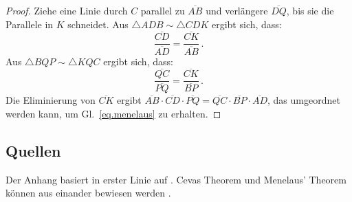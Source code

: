 \begin{proof}
Ziehe eine Linie durch $C$ parallel zu $\overline{AB}$ und verlängere $\overline{DQ}$, bis sie die Parallele in $K$ schneidet. Aus $\triangle ADB \sim \triangle CDK$ ergibt sich, dass:
\begin{equation*}
\displaystyle\frac{\overline{CD}}{\overline{AD}}=\displaystyle\frac{\overline{CK}}{\overline{AB}}\,.
\end{equation*}
Aus $\triangle BQP\sim \triangle KQC$ ergibt sich, dass:
\begin{equation*}
\displaystyle\frac{\overline{QC}}{\overline{PQ}}=\displaystyle\frac{\overline{CK}}{\overline{BP}}\,.
\end{equation*}
Die Eliminierung von $\overline{CK}$ ergibt
$\overline{AB}\cdot\overline{CD}\cdot\overline{PQ}=\overline{QC}\cdot\overline{BP}\cdot\overline{AD}$, das umgeordnet werden kann, um Gl.~\ref{eq.menelaus} zu erhalten.
\end{proof}


\subsection*{Quellen}

Der Anhang basiert in erster Linie auf \cite{gelfand}. Cevas Theorem und Menelaus' Theorem können aus einander bewiesen werden \cite{silvester}.

